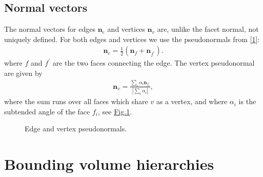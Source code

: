 \documentclass[letterpaper,10pt,english]{sphinxmanual}
\let\sphinxpxdimen\pdfpxdimen\else\newdimen\sphinxpxdimen
\begin{document}
\subsection{Normal vectors}
\label{\detokenize{DCEL:normal-vectors}}\label{\detokenize{DCEL:chap-normaldcel}}
\sphinxAtStartPar
The normal vectors for edges \(\mathbf{n}_e\) and vertices \(\mathbf{n}_v\) are, unlike the facet normal, not uniquely defined.
For both edges and vertices we use the pseudonormals from {[}\hyperlink{cite.ZZReferences:id2}{1}{]}:
\begin{equation*}
\begin{split}\mathbf{n}_{e} = \frac{1}{2}\left(\mathbf{n}_{f} + \mathbf{n}_{f^\prime}\right).\end{split}
\end{equation*}
\sphinxAtStartPar
where \(f\) and \(f^\prime\) are the two faces connecting the edge.
The vertex pseudonormal are given by
\begin{equation*}
\begin{split}\mathbf{n}_{v} = \frac{\sum_i\alpha_i\mathbf{n}_{f_i}}{\left|\sum_i\alpha_i\right|},\end{split}
\end{equation*}
\sphinxAtStartPar
where the sum runs over all faces which share \(v\) as a vertex, and where \(\alpha_i\) is the subtended angle of the face \(f_i\), see \hyperref[\detokenize{DCEL:fig-pseudonormal}]{Fig.\@ \ref{\detokenize{DCEL:fig-pseudonormal}}}.

\begin{figure}[htbp]
\centering
\capstart

\noindent\sphinxincludegraphics[width=240\sphinxpxdimen]{{Pseudonormal}.png}
\caption{Edge and vertex pseudonormals.}\label{\detokenize{DCEL:id4}}\label{\detokenize{DCEL:fig-pseudonormal}}\end{figure}

\sphinxstepscope


\section{Bounding volume hierarchies}
\label{\detokenize{BVH:bounding-volume-hierarchies}}\label{\detokenize{BVH:chap-bvh}}\label{\detokenize{BVH::doc}}
\end{document}
